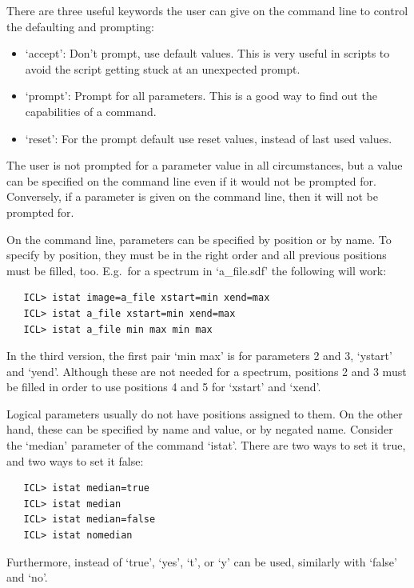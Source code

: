    There are three useful keywords the user can give on the command line
   to control the defaulting and prompting:

\begin{itemize}
\item
   `accept': Don't prompt, use default values. This is very useful in
   scripts to avoid the script getting stuck at an unexpected prompt.
\item
   `prompt': Prompt for all parameters. This is a good way to find out
   the capabilities of a command.
\item
   `reset': For the prompt default use reset values, instead of last
   used values.
\end{itemize}

   The user is not prompted for a parameter value in all circumstances,
   but a value can be specified on the command line even if it would not
   be prompted for.  Conversely, if a parameter is given on the command
   line, then it will not be prompted for.

   On the command line, parameters can be specified by position or by
   name. To specify by position, they must be in the right order and all
   previous positions must be filled, too. E.g.\ for a spectrum in
   `a\_file.sdf' the following will work:

\begin{verbatim}
   ICL> istat image=a_file xstart=min xend=max
   ICL> istat a_file xstart=min xend=max
   ICL> istat a_file min max min max
\end{verbatim}

   In the third version, the first pair `min max' is for parameters 2
   and 3, `ystart' and `yend'. Although these are not needed for a
   spectrum, positions 2 and 3 must be filled in order to use positions
   4 and 5 for `xstart' and `xend'.

   Logical parameters usually do not have positions assigned to them. On
   the other hand, these can be specified by name and value, or by
   negated name. Consider the `median' parameter of the command
   `istat'. There are two ways to set it true, and two ways to set it
   false:

\begin{verbatim}
   ICL> istat median=true
   ICL> istat median
   ICL> istat median=false
   ICL> istat nomedian
\end{verbatim}

   Furthermore, instead of `true', `yes', `t', or `y' can be
   used, similarly with `false' and `no'.

